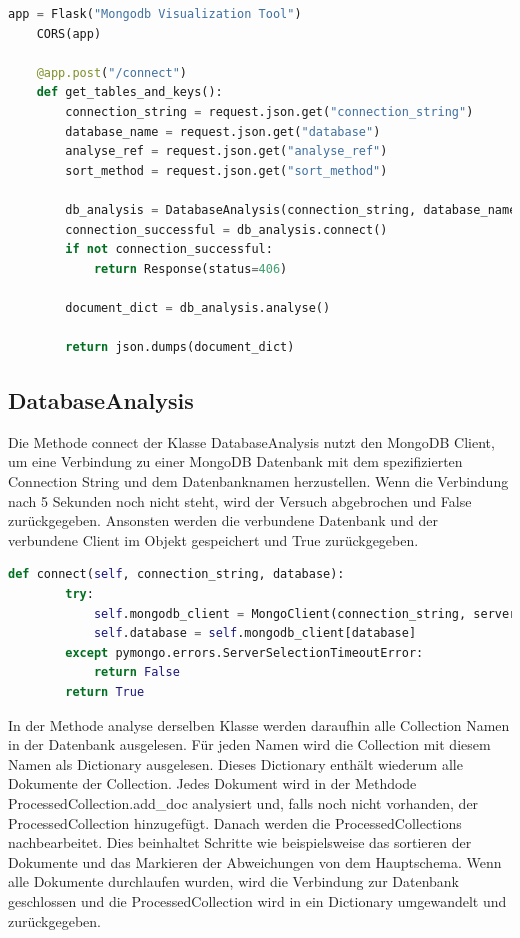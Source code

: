 \begin{lstlisting}[language=python, caption={app.py},label={lst:backend_app}]
    app = Flask("Mongodb Visualization Tool")
    CORS(app)

    @app.post("/connect")
    def get_tables_and_keys():
        connection_string = request.json.get("connection_string")
        database_name = request.json.get("database")
        analyse_ref = request.json.get("analyse_ref")
        sort_method = request.json.get("sort_method")

        db_analysis = DatabaseAnalysis(connection_string, database_name, analyse_ref, sort_method)
        connection_successful = db_analysis.connect()
        if not connection_successful:
            return Response(status=406)

        document_dict = db_analysis.analyse()

        return json.dumps(document_dict)
\end{lstlisting}

\subsection{DatabaseAnalysis}
\label{sub:ba_database_analysis}

Die Methode connect der Klasse DatabaseAnalysis nutzt  den MongoDB Client, um eine Verbindung zu einer MongoDB Datenbank mit dem spezifizierten Connection String und dem Datenbanknamen herzustellen.
Wenn die Verbindung nach 5 Sekunden noch nicht steht, wird der Versuch abgebrochen und False zurückgegeben.
Ansonsten werden die verbundene Datenbank und der verbundene Client im Objekt gespeichert und True zurückgegeben.

\begin{lstlisting}[language=python, caption={DatabaseAnalysis.connect},label={lst:backend_connect}]
    def connect(self, connection_string, database):
        try:
            self.mongodb_client = MongoClient(connection_string, serverSelectionTimeoutMS=5000)
            self.database = self.mongodb_client[database]
        except pymongo.errors.ServerSelectionTimeoutError:
            return False
        return True
\end{lstlisting}

In der Methode analyse derselben Klasse werden daraufhin alle Collection Namen in der Datenbank ausgelesen.
Für jeden Namen wird die Collection mit diesem Namen als Dictionary ausgelesen.
Dieses Dictionary enthält wiederum alle Dokumente der Collection.
Jedes Dokument wird in der Methdode ProcessedCollection.add\_doc analysiert und, falls noch nicht vorhanden, der ProcessedCollection hinzugefügt.
Danach werden die ProcessedCollections nachbearbeitet.
Dies beinhaltet Schritte wie beispielsweise das sortieren der Dokumente und das Markieren der Abweichungen von dem Hauptschema.
Wenn alle Dokumente durchlaufen wurden, wird die Verbindung zur Datenbank geschlossen und die ProcessedCollection wird in ein Dictionary umgewandelt und zurückgegeben.

